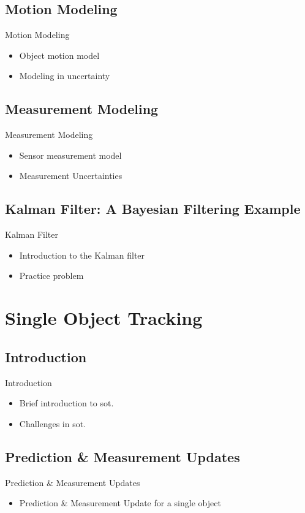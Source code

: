 \documentclass{beamer}
\begin{document}
	\subsection{Motion Modeling}
	\begin{frame}{Motion Modeling}
		\begin{itemize}
			\item Object motion model
			\item Modeling in uncertainty
		\end{itemize}
	\end{frame}
	\subsection{Measurement Modeling}
	\begin{frame}{Measurement Modeling}
		\begin{itemize}
			\item Sensor measurement model
			\item Measurement Uncertainties
		\end{itemize}
	\end{frame}
	\subsection{Kalman Filter: A Bayesian Filtering Example}
	\begin{frame}{Kalman Filter}
		\begin{itemize}
			\item Introduction to the Kalman filter
			\item Practice problem
		\end{itemize}
	\end{frame}
	\section{Single Object Tracking}	
	\subsection{Introduction}
	\begin{frame}{Introduction}
		\begin{itemize}
			\item Brief introduction to \gls{sot}.
			\item Challenges in \gls{sot}.
		\end{itemize}
	\end{frame}
	\subsection{Prediction \& Measurement Updates}
	\begin{frame}{Prediction \& Measurement Updates}
		\begin{itemize}
			\item Prediction \& Measurement Update for a single object
		\end{itemize}
	\end{frame}
\end{document}
